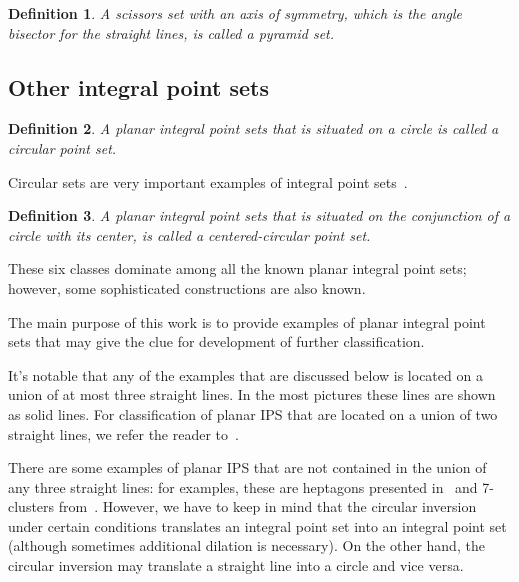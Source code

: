 \documentclass[12pt]{article}
\theoremstyle{theorem}
\theoremstyle{dfn}
\newtheorem{dfn}{Definition}
\theoremstyle{remark}
\begin{document}
\begin{dfn}
	A scissors set with an axis of symmetry,
	which is the angle bisector for the straight lines,
	is called a \textit{pyramid} set.
\end{dfn}



\subsection{Other integral point sets}

\begin{dfn}
	A planar integral point sets that is situated on a circle is called a \textit{circular}
	point set.
\end{dfn}

Circular sets are very important examples
of integral point sets~\cite{harborth1993upper,piepmeyer1996maximum,bat2018number}.


\begin{dfn}
	A planar integral point sets that is situated on the conjunction of a circle with its center,
	is called a \textit{centered-circular} point set.
\end{dfn}

These six classes dominate among all the known planar integral point sets;
however, some sophisticated constructions are also known.


The main purpose of this work is to provide examples of planar integral point sets
that may give the clue for development of further classification.

It's notable that any of the examples that are discussed below
is located on a union of at most three straight lines.
In the most pictures these lines are shown as solid lines.
For classification of planar IPS that are located on a union of two straight lines,
we refer the reader to~\cite{avdeev2019particular}.

There are some examples of planar IPS that are not contained in the union of any three straight lines:
for examples, these are heptagons presented in~\cite{kreisel2008heptagon} and 7-clusters from~\cite{kurz2013constructing}.
However, we have to keep in mind that the circular inversion under certain conditions
translates an integral point set into an integral point set
(although sometimes additional dilation is necessary).
On the other hand, the circular inversion may translate a straight line into a circle and vice versa.
\end{document}
